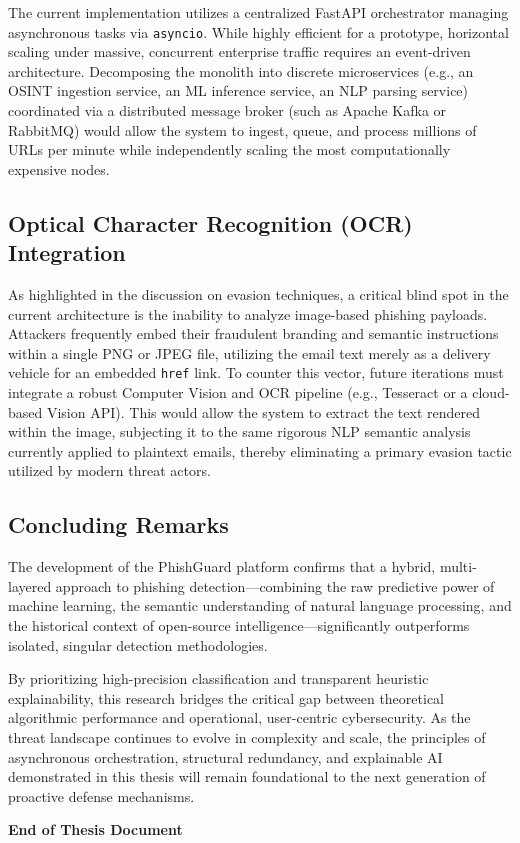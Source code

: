 The current implementation utilizes a centralized FastAPI orchestrator
managing asynchronous tasks via \texttt{asyncio}. While highly efficient
for a prototype, horizontal scaling under massive, concurrent enterprise
traffic requires an event-driven architecture. Decomposing the monolith
into discrete microservices (e.g., an OSINT ingestion service, an ML
inference service, an NLP parsing service) coordinated via a distributed
message broker (such as Apache Kafka or RabbitMQ) would allow the system
to ingest, queue, and process millions of URLs per minute while
independently scaling the most computationally expensive nodes.

\subsection{Optical Character Recognition (OCR)
Integration}\label{optical-character-recognition-ocr-integration}

As highlighted in the discussion on evasion techniques, a critical blind
spot in the current architecture is the inability to analyze image-based
phishing payloads. Attackers frequently embed their fraudulent branding
and semantic instructions within a single PNG or JPEG file, utilizing
the email text merely as a delivery vehicle for an embedded
\texttt{href} link. To counter this vector, future iterations must
integrate a robust Computer Vision and OCR pipeline (e.g., Tesseract or
a cloud-based Vision API). This would allow the system to extract the
text rendered within the image, subjecting it to the same rigorous NLP
semantic analysis currently applied to plaintext emails, thereby
eliminating a primary evasion tactic utilized by modern threat actors.

\subsection{Concluding Remarks}\label{concluding-remarks}

The development of the PhishGuard platform confirms that a hybrid,
multi-layered approach to phishing detection---combining the raw
predictive power of machine learning, the semantic understanding of
natural language processing, and the historical context of open-source
intelligence---significantly outperforms isolated, singular detection
methodologies.

By prioritizing high-precision classification and transparent heuristic
explainability, this research bridges the critical gap between
theoretical algorithmic performance and operational, user-centric
cybersecurity. As the threat landscape continues to evolve in complexity
and scale, the principles of asynchronous orchestration, structural
redundancy, and explainable AI demonstrated in this thesis will remain
foundational to the next generation of proactive defense mechanisms.

\textbf{End of Thesis Document}

